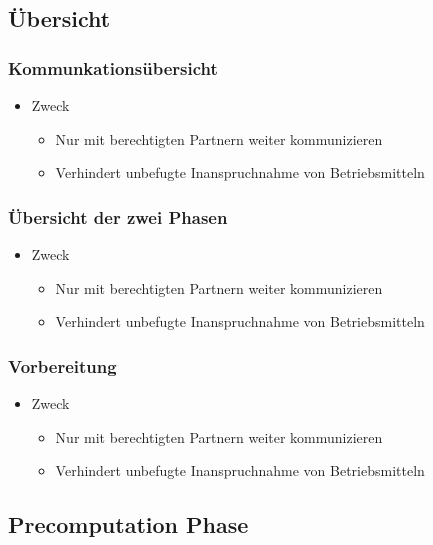 \documentclass[t, xcolor=dvipsnames]{beamer}
\begin{document}
\subsection{Übersicht} %
\begin{frame}
	\frametitle{Kommunkationsübersicht}
	\begin{itemize}
		\item Zweck
			\begin{itemize}
				\item Nur mit \alert{berechtigten Partnern} weiter kommunizieren
				\item Verhindert unbefugte Inanspruchnahme von Betriebsmitteln
			\end{itemize}
	\end{itemize}
	\vspace{\fill}
\end{frame}

\begin{frame}
	\frametitle{Übersicht der zwei Phasen}
	\begin{itemize}
		\item Zweck
			\begin{itemize}
				\item Nur mit \alert{berechtigten Partnern} weiter kommunizieren
				\item Verhindert unbefugte Inanspruchnahme von Betriebsmitteln
			\end{itemize}
	\end{itemize}
	\vspace{\fill}
\end{frame}

\begin{frame}
	\frametitle{Vorbereitung}
	\begin{itemize}
		\item Zweck
			\begin{itemize}
				\item Nur mit \alert{berechtigten Partnern} weiter kommunizieren
				\item Verhindert unbefugte Inanspruchnahme von Betriebsmitteln
			\end{itemize}
	\end{itemize}
	\vspace{\fill}
\end{frame}

\subsection{Precomputation Phase} %
\end{document}
